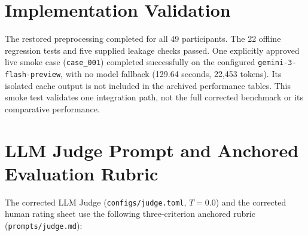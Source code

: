 \documentclass{article}
\begin{document}
\newpage
\appendix
\onecolumn

\section{Implementation Validation}
The restored preprocessing completed for all 49 participants. The 22 offline regression tests and five supplied leakage checks passed. One explicitly approved live smoke case (\texttt{case\_001}) completed successfully on the configured \texttt{gemini-3-flash-preview}, with no model fallback (129.64 seconds, 22,453 tokens). Its isolated cache output is not included in the archived performance tables. This smoke test validates one integration path, not the full corrected benchmark or its comparative performance.

\section{LLM Judge Prompt and Anchored Evaluation Rubric}
\label{app:rubric}

The corrected LLM Judge (\texttt{configs/judge.toml}, $T=0.0$) and the corrected human rating sheet use the following three-criterion anchored rubric (\texttt{prompts/judge.md}):
\end{document}
